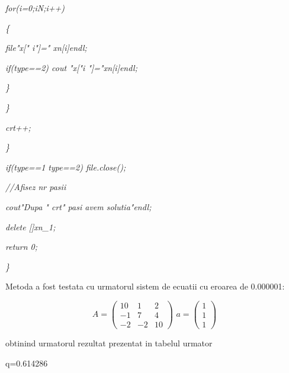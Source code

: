 \documentclass[a4paper,twoside]{book}
\begin{document}
\textit{\qquad \qquad \qquad for(i=0;i\TEXTsymbol{<}N;i++)}

\textit{\qquad \qquad \qquad \{}

\textit{\qquad \qquad \qquad \qquad file\TEXTsymbol{<}\TEXTsymbol{<}"x["%
\TEXTsymbol{<}\TEXTsymbol{<}i\TEXTsymbol{<}\TEXTsymbol{<}"]="\TEXTsymbol{<}%
\TEXTsymbol{<}xn[i]\TEXTsymbol{<}\TEXTsymbol{<}endl;}

\textit{\qquad \qquad \qquad \qquad if(type==2) cout\TEXTsymbol{<}%
\TEXTsymbol{<}"x["\TEXTsymbol{<}\TEXTsymbol{<}i\TEXTsymbol{<}\TEXTsymbol{<}%
"]="\TEXTsymbol{<}\TEXTsymbol{<}xn[i]\TEXTsymbol{<}\TEXTsymbol{<}endl;}

\textit{\qquad \qquad \qquad \}}

\textit{\qquad \qquad \}}

\textit{\qquad \qquad crt++;}

\textit{\qquad \}}

\textit{\qquad if(type==1 \TEXTsymbol{\vert}\TEXTsymbol{\vert} type==2)
file.close();}

\textit{\qquad //Afisez nr pasii}

\textit{\qquad cout\TEXTsymbol{<}\TEXTsymbol{<}"Dupa "\TEXTsymbol{<}%
\TEXTsymbol{<}crt\TEXTsymbol{<}\TEXTsymbol{<}" pasi avem solutia"\TEXTsymbol{%
<}\TEXTsymbol{<}endl;}

\textit{\qquad delete []xn\_1;}

\textit{\qquad return 0;}

\textit{\}}

Metoda a fost testata cu urmatorul sistem de ecuatii cu eroarea de 0.000001:

\begin{equation*}
A=\left( 
\begin{array}{ccc}
10 & 1 & 2 \\ 
-1 & 7 & 4 \\ 
-2 & -2 & 10%
\end{array}%
\right) \,\,a=\left( 
\begin{array}{c}
1 \\ 
1 \\ 
1%
\end{array}%
\right)
\end{equation*}

obtinind urmatorul rezultat prezentat in tabelul urmator

q=0.614286
\end{document}
